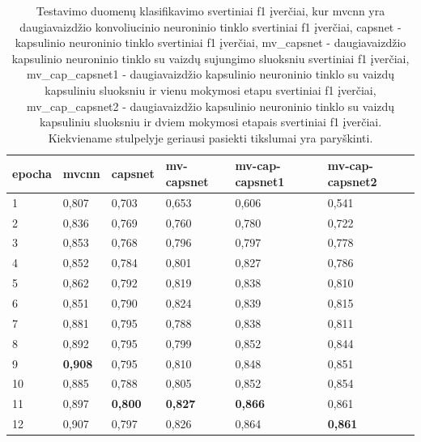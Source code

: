 \begin{table}[]
	\caption{
		Testavimo duomenų klasifikavimo svertiniai f1 įverčiai, kur mvcnn yra daugiavaizdžio konvoliucinio neuroninio tinklo svertiniai f1 įverčiai, capsnet - kapsulinio neuroninio tinklo svertiniai f1 įverčiai, mv\_capsnet - daugiavaizdžio kapsulinio neuroninio tinklo su vaizdų sujungimo sluoksniu svertiniai f1 įverčiai, mv\_cap\_capsnet1 - daugiavaizdžio kapsulinio neuroninio tinklo su vaizdų kapsuliniu sluoksniu ir vienu mokymosi etapu svertiniai f1 įverčiai, mv\_cap\_capsnet2 - daugiavaizdžio kapsulinio neuroninio tinklo su vaizdų kapsuliniu sluoksniu ir dviem mokymosi etapais svertiniai f1 įverčiai. Kiekviename stulpelyje geriausi pasiekti tikslumai yra paryškinti.
	}
	\begin{tabular}{l|l|l|l|l|l}
		epocha & mvcnn & capsnet & mv-capsnet & mv-cap-capsnet1 & mv-cap-capsnet2 \\
		\hline
		1 & 0,807 &   0,703 &      0,653 &           0,606 &           0,541 \\
		2 & 0,836 &   0,769 &      0,760 &           0,780 &           0,722 \\
		3 & 0,853 &   0,768 &      0,796 &           0,797 &           0,778 \\
		4 & 0,852 &   0,784 &      0,801 &           0,827 &           0,786 \\
		5 & 0,862 &   0,792 &      0,819 &           0,838 &           0,810 \\
		6 & 0,851 &   0,790 &      0,824 &           0,839 &           0,815 \\
		7 & 0,881 &   0,795 &      0,788 &           0,838 &           0,811 \\
		8 & 0,892 &   0,795 &      0,799 &           0,852 &           0,844 \\
		9 & \textbf{0,908} &   0,795 &      0,810 &           0,848 &           0,851 \\
		10 & 0,885 &   0,788 &      0,805 &           0,852 &           0,854 \\
		11 & 0,897 &   \textbf{0,800} &      \textbf{0,827} &           \textbf{0,866} &           0,861 \\
		12 & 0,907 &   0,797 &      0,826 &           0,864 &           \textbf{0,861} \\
	\end{tabular}
	\label{tbl:weighted_f1}
\end{table}

